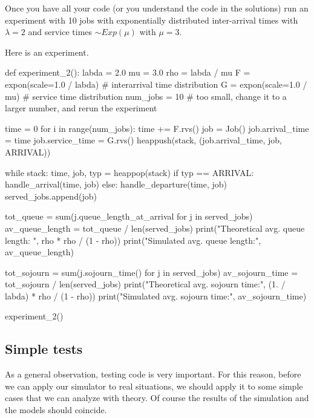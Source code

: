 \begin{exercise}
  Once you have all your code (or you understand the code in the solutions) run an experiment with 10 jobs with exponentially distributed inter-arrival times with $\lambda=2$ and service times $\sim Exp(\mu)$ with $\mu=3$.
\begin{solution}
Here is an experiment.
\begin{pyverbatim}
def experiment_2():
    labda = 2.0
    mu = 3.0
    rho = labda / mu
    F = expon(scale=1.0 / labda)  # interarrival time distribution
    G = expon(scale=1.0 / mu)  # service time distribution
    num_jobs = 10  # too small, change it to a larger number, and rerun the experiment

    time = 0
    for i in range(num_jobs):
        time += F.rvs()
        job = Job()
        job.arrival_time = time
        job.service_time = G.rvs()
        heappush(stack, (job.arrival_time, job, ARRIVAL))

    while stack:
        time, job, typ = heappop(stack)
        if typ == ARRIVAL:
            handle_arrival(time, job)
        else:
            handle_departure(time, job)
            served_jobs.append(job)

    tot_queue = sum(j.queue_length_at_arrival for j in served_jobs)
    av_queue_length = tot_queue / len(served_jobs)
    print("Theoretical avg. queue length: ", rho * rho / (1 - rho))
    print("Simulated avg. queue length:", av_queue_length)

    tot_sojourn = sum(j.sojourn_time() for j in served_jobs)
    av_sojourn_time = tot_sojourn / len(served_jobs)
    print("Theoretical avg. sojourn time:", (1. / labda) * rho / (1 - rho))
    print("Simulated avg. sojourn time:", av_sojourn_time)


experiment_2()
\end{pyverbatim}
\end{solution}

\end{exercise}

\subsection{Simple tests}
\label{sec:testing}

As a general observation, testing code is very important.
For this reason, before we can apply our simulator to real situations, we should apply it to some simple cases that we can analyze with theory.
Of course the results of the simulation and the models should coincide.

